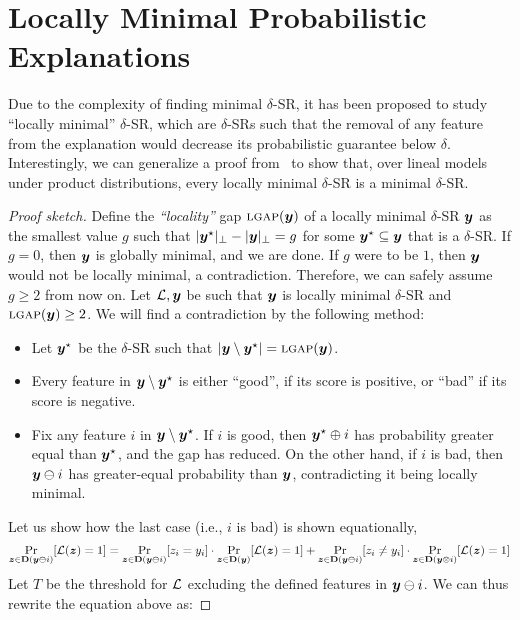 \section{Locally Minimal Probabilistic Explanations}

Due to the complexity of finding minimal $\delta$-SR, it has been proposed to study ``locally minimal'' $\delta$-SR, which are $\delta$-SRs such that the removal of any feature from the explanation would decrease its probabilistic guarantee below $\delta$.
Interestingly, we can generalize a proof from~\cite{Arenas_Barcelo_Romero_Subercaseaux_2022} to show that, over lineal models under product distributions, every locally minimal $\delta$-SR is a minimal $\delta$-SR.

\begin{proof}[Proof sketch]
    Define the \emph{``locality''} gap $\textsc{lgap}({\bm{y}})$ of a locally minimal $\delta$-SR ${\bm{y}}$ as the smallest value $g$ such that $|{\bm{y}}^\star|_\bot - |{\bm{y}}|_\bot = g$ for some ${\bm{y}}^\star \subseteq {\bm{y}}$ that is a $\delta$-SR.
    If $g = 0$, then ${\bm{y}}$ is globally minimal, and we are done. If $g$ were to be $1$, then ${\bm{y}}$ would not be locally minimal, a contradiction. Therefore, we can safely assume $g \geq 2$ from now on.
    Let $\mathcal{L}, {\bm{y}}$ be such that ${\bm{y}}$ is locally minimal $\delta$-SR and $\textsc{lgap}({\bm{y}}) \geq 2$. We will find a contradiction by the following method:
    \begin{itemize}
        \item Let ${\bm{y}}^\star$ be the $\delta$-SR such that $| {\bm{y}} \setminus {\bm{y}}^\star | = \textsc{lgap}({\bm{y}})$.
        \item Every feature in ${\bm{y}} \setminus {\bm{y}}^\star$ is either ``good'', if its score is positive, or ``bad'' if its score is negative.
        \item Fix any feature $i$ in ${\bm{y}} \setminus {\bm{y}}^\star$. If $i$ is good, then ${\bm{y}}^\star \oplus i$ has probability greater equal than ${\bm{y}}^\star$, and the gap has reduced.
                On the other hand, if $i$ is bad, then ${\bm{y}} \ominus i$ has greater-equal probability than ${\bm{y}}$, contradicting it being locally minimal.
    \end{itemize}

    Let us show how  the last case (i.e., $i$ is bad) is shown equationally,
    \[
        \Pr_{{\bm{z}} \in \mathbf{D}({\bm{y}} \ominus i)}[\mathcal{L}({\bm{z}}) = 1] = \Pr_{{\bm{z}} \in \mathbf{D}({\bm{y}}  \ominus i)}[z_i = y_i] \cdot \Pr_{{\bm{z}} \in \mathbf{D}({\bm{y}})}[\mathcal{L}({\bm{z}}) = 1] +   \Pr_{{\bm{z}} \in \mathbf{D}({\bm{y}}  \ominus i)}[z_i \neq y_i] \cdot \Pr_{{\bm{z}} \in \mathbf{D}({\bm{y}} \otimes i)}[\mathcal{L}({\bm{z}}) = 1]
    \]
    Let $T$ be the threshold for $\mathcal{L}$ excluding the defined features in ${\bm{y}} \ominus i$.
    We can thus rewrite the equation above as:
     

\end{proof}
